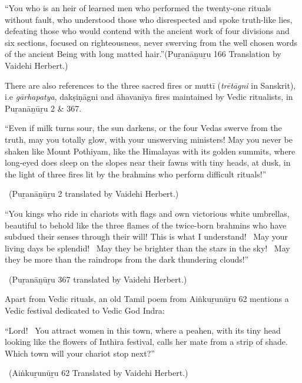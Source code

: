 \begin{myquote}
“You who is an heir of learned men who performed the twenty-one rituals without fault, who understood those who disrespected and spoke truth-like lies, defeating those who would contend with the ancient work of four divisions and six sections, focused on righteousness, never swerving from the well chosen words of the ancient Being with long matted hair.”\hfill (Puṟanāṉuṟu 166 Translation by Vaidehi Herbert.)
\end{myquote}

There are also references to the three sacred fires or muttī (\textit{trētāgni} in Sanskrit), i.e \textit{gārhapatya}, dakṣiṇāgni and āhavanīya fires maintained by Vedic ritualists, in Puṟanāṉūṟu 2 \& 367.

\begin{myquote}
“Even if milk turns sour, the sun darkens, or the four Vedas swerve from the truth, may you totally glow, with your unswerving ministers! May you never be shaken like Mount Pothiyam, like the Himalayas with its golden summits, where long-eyed does sleep on the slopes near their fawns with tiny heads, at dusk, in the light of three fires lit by the brahmins who perform difficult rituals!”

~\hfill (Puṟanāṉūṟu 2 translated by Vaidehi Herbert.)
\end{myquote}

\begin{myquote}
“You kings who ride in chariots with flags and own victorious white umbrellas, beautiful to behold like the three flames of the twice-born brahmins who have subdued their senses through their will! This is what I understand!  May your living days be splendid!  May they be brighter than the stars in the sky!  May they be more than the raindrops from the dark thundering clouds!”

~\hfill (Puṟanāṉūṟu 367 translated by Vaidehi Herbert.)
\end{myquote}

Apart from Vedic rituals, an old Tamil poem from Aiṅkuṟunūṟu 62 mentions a Vedic festival dedicated to Vedic God Indra:

\begin{myquote}
“Lord!  You attract women in this town, where a peahen, with its tiny head looking like the flowers of Inthira festival, calls her mate from a strip of shade. Which town will your chariot stop next?”

~\hfill (Aiṅkuṟunūṟu 62 Translated by Vaidehi Herbert.)
\end{myquote}

